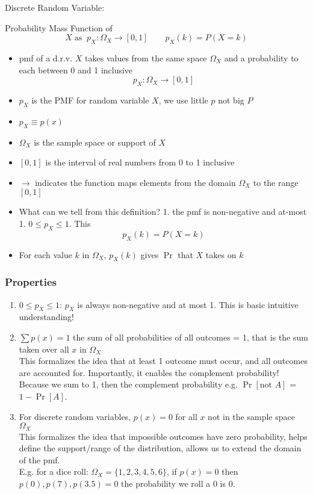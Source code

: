 \newcommand{\pmf}{p_X}

\begin{definition}
    Discrete Random Variable: 
\end{definition}

\begin{definition}
    Probability Mass Function of
    \[
    X \; \text{as} \;\;p_X:\Omega_X \to [0,1] \qquad  p_X(k) = P(X = k)
    \]
\end{definition}
\begin{itemize}
    \item pmf of a d.r.v. $X$ takes values from the same space $\Omega_X$ and a probability to each between 0 and 1 inclusive
    \[
    p_X:\Omega_X \to [0,1]
    \]
    \item $p_X$ is the PMF for random variable $X$, we use little $p$ not big $P$
    \item $p_X \equiv p(x)$ 
    \item $\Omega_X$ is the sample space or support of $X$
    \item $[0,1]$ is the interval of real numbers from 0 to 1 inclusive
    \item $\to$ indicates the function maps elements from the domain $\Omega_X$ to the range $[0,1]$
    \item What can we tell from this definition? 1. the pmf is non-negative and at-most 1. $0 \leq p_X \leq 1$. This \\
    \[
        p_X(k) = P(X = k)
    \]
    \item For each value $k$ in $\Omega_X$, $p_X(k)$ gives $\Pr$ that $X$ takes on $k$
\end{itemize}
\subsubsection*{Properties}
\begin{enumerate}
    \item $0 \leq p_X \leq 1$: $p_X$ is always non-negative and at most 1. This is basic intuitive understanding!
    \item $\sum p(x) = 1$ the sum of all probabilities of all outcomes = 1, that is the sum taken over all $x$ in $\Omega_X$ \\
    This formalizes the idea that at least 1 outcome must occur, and all outcomes are accounted for. Importantly, it enables the complement probability! Because we sum to 1, then the complement probability e.g. $\Pr[\text{not } A]$ = $1 - \Pr[A]$.
    \item For discrete random variables, $p(x) = 0$ for all $x$ not in the sample space $\Omega_X$ \\
    This formalizes the idea that impossible outcomes have zero probability, helps define the support/range of the distribution, allows us to extend the domain of the pmf. \\
    E.g. for a dice roll: $\Omega_X = \{1,2,3,4,5,6\}$, if $p(x) = 0$ then $p(0), p(7), p(3.5) = 0$ the probability we roll a 0 is 0.
\end{enumerate}

